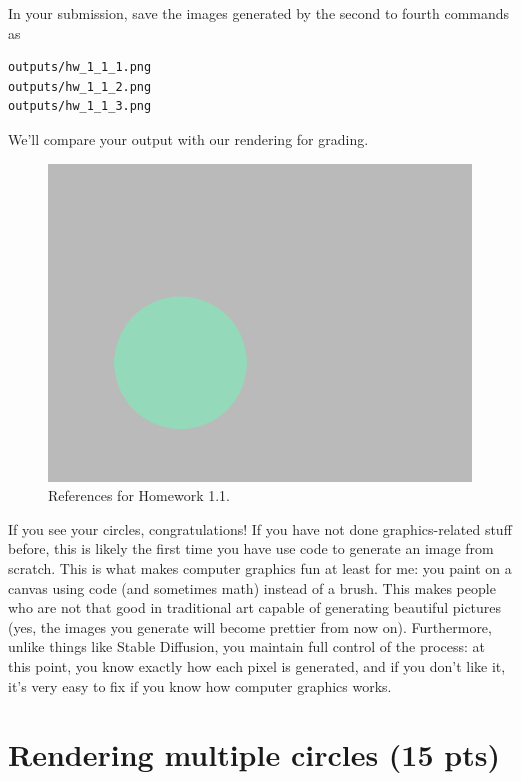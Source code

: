 In your submission, save the images generated by the second to fourth commands as
\begin{lstlisting}[language=bash]
outputs/hw_1_1_1.png
outputs/hw_1_1_2.png
outputs/hw_1_1_3.png
\end{lstlisting}
We'll compare your output with our rendering for grading.

\begin{figure}[ht]
    \centering
    \includegraphics[width=0.5\linewidth]{imgs/hw_1_1.png}
    \caption{References for Homework 1.1.}
    \label{fig:hw1_1}
\end{figure}

If you see your circles, congratulations! If you have not done graphics-related stuff before, this is likely the first time you have use code to generate an image from scratch. This is what makes computer graphics fun at least for me: you paint on a canvas using code (and sometimes math) instead of a brush. This makes people who are not that good in traditional art capable of generating beautiful pictures (yes, the images you generate will become prettier from now on). Furthermore, unlike things like Stable Diffusion, you maintain full control of the process: at this point, you know exactly how each pixel is generated, and if you don't like it, it's very easy to fix if you know how computer graphics works.

\section{Rendering multiple circles (15 pts)}


